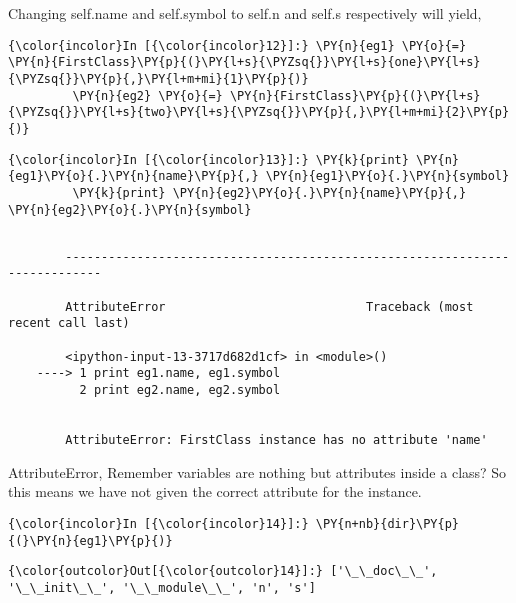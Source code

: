     Changing self.name and self.symbol to self.n and self.s respectively
will yield,

    \begin{Verbatim}[commandchars=\\\{\}]
{\color{incolor}In [{\color{incolor}12}]:} \PY{n}{eg1} \PY{o}{=} \PY{n}{FirstClass}\PY{p}{(}\PY{l+s}{\PYZsq{}}\PY{l+s}{one}\PY{l+s}{\PYZsq{}}\PY{p}{,}\PY{l+m+mi}{1}\PY{p}{)}
         \PY{n}{eg2} \PY{o}{=} \PY{n}{FirstClass}\PY{p}{(}\PY{l+s}{\PYZsq{}}\PY{l+s}{two}\PY{l+s}{\PYZsq{}}\PY{p}{,}\PY{l+m+mi}{2}\PY{p}{)}
\end{Verbatim}

    \begin{Verbatim}[commandchars=\\\{\}]
{\color{incolor}In [{\color{incolor}13}]:} \PY{k}{print} \PY{n}{eg1}\PY{o}{.}\PY{n}{name}\PY{p}{,} \PY{n}{eg1}\PY{o}{.}\PY{n}{symbol}
         \PY{k}{print} \PY{n}{eg2}\PY{o}{.}\PY{n}{name}\PY{p}{,} \PY{n}{eg2}\PY{o}{.}\PY{n}{symbol}
\end{Verbatim}

    \begin{Verbatim}[commandchars=\\\{\}]

        ---------------------------------------------------------------------------

        AttributeError                            Traceback (most recent call last)

        <ipython-input-13-3717d682d1cf> in <module>()
    ----> 1 print eg1.name, eg1.symbol
          2 print eg2.name, eg2.symbol


        AttributeError: FirstClass instance has no attribute 'name'

    \end{Verbatim}

    AttributeError, Remember variables are nothing but attributes inside a
class? So this means we have not given the correct attribute for the
instance.

    \begin{Verbatim}[commandchars=\\\{\}]
{\color{incolor}In [{\color{incolor}14}]:} \PY{n+nb}{dir}\PY{p}{(}\PY{n}{eg1}\PY{p}{)}
\end{Verbatim}

            \begin{Verbatim}[commandchars=\\\{\}]
{\color{outcolor}Out[{\color{outcolor}14}]:} ['\_\_doc\_\_', '\_\_init\_\_', '\_\_module\_\_', 'n', 's']
\end{Verbatim}
        
